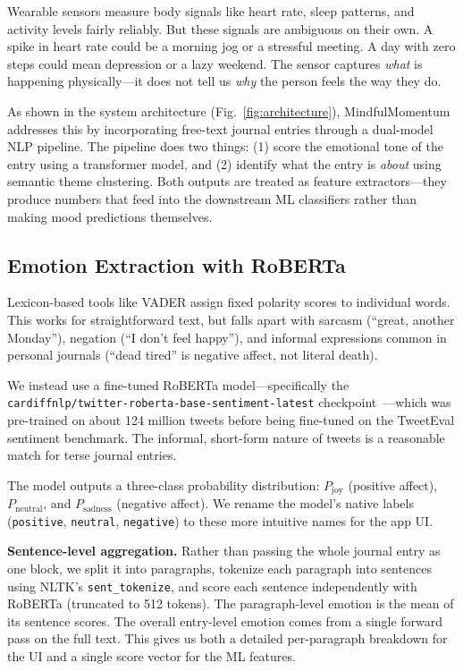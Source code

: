 \documentclass[conference]{IEEEtran}
\begin{document}
Wearable sensors measure body signals like heart rate, sleep patterns, and activity levels fairly reliably. But these signals are ambiguous on their own. A spike in heart rate could be a morning jog or a stressful meeting. A day with zero steps could mean depression or a lazy weekend. The sensor captures \textit{what} is happening physically---it does not tell us \textit{why} the person feels the way they do.

As shown in the system architecture (Fig.~\ref{fig:architecture}), MindfulMomentum addresses this by incorporating free-text journal entries through a dual-model NLP pipeline. The pipeline does two things: (1) score the emotional tone of the entry using a transformer model, and (2) identify what the entry is \textit{about} using semantic theme clustering. Both outputs are treated as feature extractors---they produce numbers that feed into the downstream ML classifiers rather than making mood predictions themselves.

\subsection{Emotion Extraction with RoBERTa}

Lexicon-based tools like VADER assign fixed polarity scores to individual words. This works for straightforward text, but falls apart with sarcasm (``great, another Monday''), negation (``I don't feel happy''), and informal expressions common in personal journals (``dead tired'' is negative affect, not literal death).

We instead use a fine-tuned RoBERTa model---specifically the \texttt{cardiffnlp/\allowbreak twitter-\allowbreak roberta-\allowbreak base-\allowbreak sentiment-\allowbreak latest} checkpoint~\cite{liu2019roberta}---which was pre-trained on about 124 million tweets before being fine-tuned on the TweetEval sentiment benchmark. The informal, short-form nature of tweets is a reasonable match for terse journal entries.

The model outputs a three-class probability distribution: $P_{\text{joy}}$ (positive affect), $P_{\text{neutral}}$, and $P_{\text{sadness}}$ (negative affect). We rename the model's native labels (\texttt{positive}, \texttt{neutral}, \texttt{negative}) to these more intuitive names for the app UI.

\textbf{Sentence-level aggregation.} Rather than passing the whole journal entry as one block, we split it into paragraphs, tokenize each paragraph into sentences using NLTK's \texttt{sent\_tokenize}, and score each sentence independently with RoBERTa (truncated to 512 tokens). The paragraph-level emotion is the mean of its sentence scores. The overall entry-level emotion comes from a single forward pass on the full text. This gives us both a detailed per-paragraph breakdown for the UI and a single score vector for the ML features.
\end{document}
